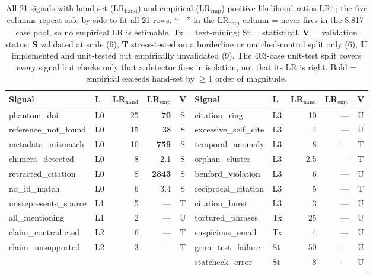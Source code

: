 \documentclass[letterpaper]{article} %
\begin{document}
\begin{table}[!tb]
\centering
\scriptsize
\renewcommand{\arraystretch}{0.95}
\setlength{\tabcolsep}{3pt}
\begin{tabular}{@{}llrrc@{\hspace{1.2em}}llrrc@{}}
\toprule
\textbf{Signal} & \textbf{L} & \textbf{LR$_{\text{hand}}$} & \textbf{LR$_{\text{emp}}$} & \textbf{V}
& \textbf{Signal} & \textbf{L} & \textbf{LR$_{\text{hand}}$} & \textbf{LR$_{\text{emp}}$} & \textbf{V} \\
\midrule
phantom\_doi          & L0 & 25 & \textbf{70}   & S & citation\_ring        & L3 & 10  & --- & U \\
reference\_not\_found & L0 & 15 & 38            & S & excessive\_self\_cite & L3 & 4   & --- & U \\
metadata\_mismatch    & L0 & 10 & \textbf{759}  & S & temporal\_anomaly     & L3 & 8   & --- & T \\
chimera\_detected     & L0 & 8  & 2.1           & S & orphan\_cluster       & L3 & 2.5 & --- & T \\
retracted\_citation   & L0 & 8  & \textbf{2343} & S & benford\_violation    & L3 & 6   & --- & U \\
no\_id\_match         & L0 & 6  & 3.4           & S & reciprocal\_citation  & L3 & 5   & --- & T \\
misrepresents\_source & L1 & 5  & ---           & T & citation\_burst       & L3 & 3   & --- & U \\
all\_mentioning       & L1 & 2  & ---           & U & tortured\_phrases     & Tx & 25  & --- & U \\
claim\_contradicted   & L2 & 6  & ---           & T & suspicious\_email     & Tx & 4   & --- & U \\
claim\_unsupported    & L2 & 3  & ---           & T & grim\_test\_failure   & St & 50  & --- & U \\
                      &    &    &               &   & statcheck\_error      & St & 8   & --- & U \\
\bottomrule
\end{tabular}
\caption{All 21 signals with hand-set (LR$_{\text{hand}}$) and empirical (LR$_{\text{emp}}$) positive likelihood ratios LR$^{+}$; the five columns repeat side by side to fit all 21 rows. ``---'' in the LR$_{\text{emp}}$ column = never fires in the 8{,}817-case pool, so no empirical LR is estimable. Tx = text-mining; St = statistical. \textbf{V} = validation status: \textbf{S} validated at scale (6), \textbf{T} stress-tested on a borderline or matched-control split only (6), \textbf{U} implemented and unit-tested but empirically unvalidated (9). The 403-case unit-test split covers every signal but checks only that a detector fires in isolation, not that its LR is right. Bold = empirical exceeds hand-set by $\geq$1 order of magnitude.}
\label{tab:lrs}
\end{table}
\end{document}
